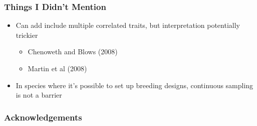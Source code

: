 \documentclass{beamer}
\begin{document}
\begin{frame}
	\frametitle{Things I Didn't Mention}
	\begin{itemize}
		\item Can add include multiple correlated traits, but interpretation potentially trickier
		\begin{itemize}
			\item Chenoweth and Blows (2008)
			\item Martin et al (2008)
		\end{itemize}
		\item In species where it's possible to set up breeding designs, continuous sampling is not a barrier
	\end{itemize}
\end{frame}


\begin{frame}
	\frametitle{Acknowledgements}
\end{frame}
\end{document}
